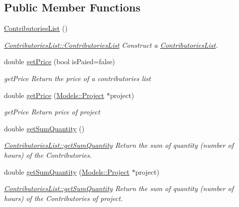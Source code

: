 \subsection*{Public Member Functions}
\begin{DoxyCompactItemize}
\item 
\hypertarget{classModels_1_1ContributoriesList_a3563e04b5d5b144846679f3ef4fd9387}{}\hyperlink{classModels_1_1ContributoriesList_a3563e04b5d5b144846679f3ef4fd9387}{Contributories\+List} ()\label{classModels_1_1ContributoriesList_a3563e04b5d5b144846679f3ef4fd9387}

\begin{DoxyCompactList}\small\item\em \hyperlink{classModels_1_1ContributoriesList_a3563e04b5d5b144846679f3ef4fd9387}{Contributories\+List\+::\+Contributories\+List} Construct a \hyperlink{classModels_1_1ContributoriesList}{Contributories\+List}. \end{DoxyCompactList}\item 
double \hyperlink{classModels_1_1ContributoriesList_a29712a353353a14f06a44314fffbe61c}{get\+Price} (bool is\+Paied=false)
\begin{DoxyCompactList}\small\item\em get\+Price Return the price of a contributories list \end{DoxyCompactList}\item 
double \hyperlink{classModels_1_1ContributoriesList_ad5ffb2920d2c818f1283a3f26b14a058}{get\+Price} (\hyperlink{classModels_1_1Project}{Models\+::\+Project} $\ast$project)
\begin{DoxyCompactList}\small\item\em get\+Price Return price of project \end{DoxyCompactList}\item 
double \hyperlink{classModels_1_1ContributoriesList_af9b3b1b703cebeef552d058999ffcc4c}{get\+Sum\+Quantity} ()
\begin{DoxyCompactList}\small\item\em \hyperlink{classModels_1_1ContributoriesList_af9b3b1b703cebeef552d058999ffcc4c}{Contributories\+List\+::get\+Sum\+Quantity} Return the sum of quantity (number of hours) of the Contributories. \end{DoxyCompactList}\item 
double \hyperlink{classModels_1_1ContributoriesList_a7b3cbc06dace77fcc1d00fd8f25fa87a}{get\+Sum\+Quantity} (\hyperlink{classModels_1_1Project}{Models\+::\+Project} $\ast$project)
\begin{DoxyCompactList}\small\item\em \hyperlink{classModels_1_1ContributoriesList_af9b3b1b703cebeef552d058999ffcc4c}{Contributories\+List\+::get\+Sum\+Quantity} Return the sum of quantity (number of hours) of the Contributories of project. \end{DoxyCompactList}\item 

\end{DoxyCompactItemize}
